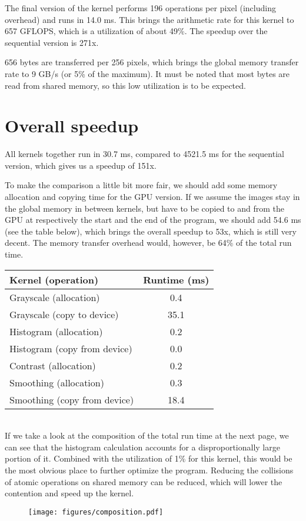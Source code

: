 \documentclass[11pt,a4paper]{article}
\begin{document}
The final version of the kernel performs 196 operations per pixel (including overhead) and runs in 14.0 ms. This brings the arithmetic rate for this kernel to 657 GFLOPS, which is a utilization of about 49\%. The speedup over the sequential version is 271x.

656 bytes are transferred per 256 pixels, which brings the global memory transfer rate to 9 GB/s (or 5\% of the maximum). It must be noted that most bytes are read from shared memory, so this low utilization is to be expected.

\section{Overall speedup}
All kernels together run in 30.7 ms, compared to 4521.5 ms for the sequential version, which gives us a speedup of 151x.

To make the comparison a little bit more fair, we should add some memory allocation and copying time for the GPU version. If we assume the images stay in the global memory in between kernels, but have to be copied to and from the GPU at respectively the start and the end of the program, we should add 54.6 ms (see the table below), which brings the overall speedup to 53x, which is still very decent. The memory transfer overhead would, however, be 64\% of the total run time. \\

\begin{tabular}{ | l | S | }
	\hline
	\textbf{Kernel (operation)} & \textbf{Runtime (ms)} \\
	\hline
	Grayscale (allocation) & 0.4 \\
	\hline
	Grayscale (copy to device) & 35.1 \\
	\hline
	Histogram (allocation) & 0.2 \\
	\hline
	Histogram (copy from device) & 0.0 \\
	\hline
	Contrast (allocation) & 0.2 \\
	\hline
	Smoothing (allocation) & 0.3 \\
	\hline
	Smoothing (copy from device) & 18.4 \\
	\hline
\end{tabular} \\

If we take a look at the composition of the total run time at the next page, we can see that the histogram calculation accounts for a disproportionally large portion of it. Combined with the utilization of 1\% for this kernel, this would be the most obvious place to further optimize the program. Reducing the collisions of atomic operations on shared memory can be reduced, which will lower the contention and speed up the kernel.

\begin{figure}[t]
\texttt{[image: figures/composition.pdf]}
\end{figure}
\end{document}
